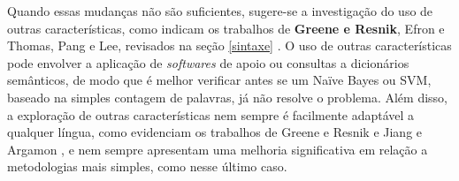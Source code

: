 Quando essas mudanças não são suficientes, sugere-se a investigação do uso de outras características, como indicam os trabalhos de \textbf{Greene e Resnik}, Efron e Thomas, Pang e Lee, revisados na seção \ref{sintaxe} \cite{greene} \cite{efron} \cite{get-out-the-vote}. O uso de outras características pode envolver a aplicação de \emph{softwares} de apoio ou consultas a dicionários semânticos, de modo que é melhor verificar antes se um Naïve Bayes ou SVM, baseado na simples contagem de palavras, já não resolve o problema. Além disso, a exploração de outras características nem sempre é facilmente adaptável a qualquer língua, como evidenciam os trabalhos de Greene e Resnik \cite{greene} e Jiang e Argamon \cite{jiang-argamon}, e nem sempre apresentam uma melhoria significativa em relação a metodologias mais simples, como nesse último caso.
 



